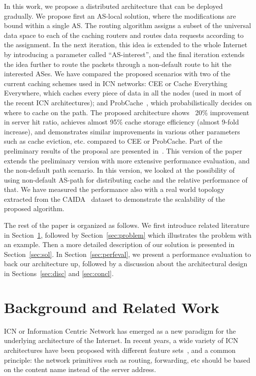 \documentclass[article]{elsarticle}
\begin{document}
In this work, we propose a distributed architecture that can be deployed gradually. We propose first an AS-local solution, where the modifications are bound within a single AS. The routing algorithm assigns a subset of the universal data space to each of the caching routers and routes data requests according to the assignment. In the next iteration, this idea is extended to the whole Internet by introducing a parameter called ``AS-interest'', and the final iteration extends the idea further to route the packets through a non-default route to hit the interested ASes. We have compared the proposed scenarios with two of the current caching schemes used in ICN networks: CEE or Cache Everything Everywhere, which caches every piece of data in all the nodes (used in most of the recent ICN architectures); and ProbCache~\cite{psarasprobabilistic}, which probabilistically decides on where to cache on the path. The proposed architecture shows ~20\% improvement in server hit ratio, achieves almost 95\% cache storage efficiency (almost 9-fold increase), and demonstrates similar improvements in various other parameters such as cache eviction, etc. compared to CEE or ProbCache. Part of the preliminary results of the proposal are presented in~\cite{myinfocom}. This version of the paper extends the preliminary version with more extensive performance evaluation, and the non-default path scenario. In this version, we looked at the possibility of using non-default AS-path for distributing cache and the relative performance of that. We have measured the performance also with a real world topology extracted from the CAIDA~\cite{skitter} dataset to demonstrate the scalability of the proposed algorithm. 

The rest of the paper is organized as follows. We first introduce related literature in Section~\ref{sec:related}, followed by Section~\ref{sec:problem} which illustrates the problem with an example. Then a more detailed description of our solution is presented in Section~\ref{sec:sol}. In Section~\ref{sec:perfeval}, we present a performance evaluation to back our architecture up, followed by a discussion about the architectural design in Sections~\ref{sec:disc} and \ref{sec:concl}.

\section{Background and Related Work}
\label{sec:related}
ICN or Information Centric Network has emerged as a new paradigm for the underlying architecture of the Internet. In recent years, a wide variety of ICN architectures have been proposed with different feature sets~\cite{ccn, netinf, psirp, triad, dona}, and a common principle: the network primitives such as routing, forwarding, etc should be based on the content name instead of the server address.
\end{document}
